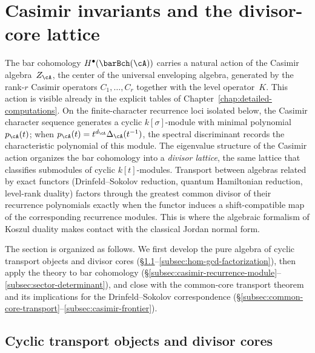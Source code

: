 
\section{Casimir invariants and the divisor-core lattice}
\label{sec:casimir-divisor-core}

The bar cohomology $H^\bullet(\barBch(\cA))$ carries a natural
action of the Casimir algebra~$Z_\cA$, the center of the
universal enveloping algebra, generated by the rank-$r$ Casimir
operators $C_1,\ldots,C_r$ together with the level
operator~$K$. This action is visible already in the explicit
tables of Chapter~\ref{chap:detailed-computations}. On the
finite-character recurrence loci isolated below, the Casimir character
sequence generates a cyclic $k[\sigma]$-module with minimal polynomial
$p_\cA(t)$; when $p_\cA(t)=t^{d_\cA}\Delta_\cA(t^{-1})$, the
spectral discriminant records the characteristic polynomial of this
module. The eigenvalue structure of the Casimir action organizes the
bar cohomology into a \emph{divisor lattice}, the same lattice that
classifies submodules of cyclic $k[t]$-modules. Transport between
algebras related by exact functors (Drinfeld--Sokolov reduction,
quantum Hamiltonian reduction, level-rank duality) factors through
the greatest common divisor of their recurrence polynomials exactly
when the functor induces a shift-compatible map of the corresponding
recurrence modules. This is where the algebraic formalism of Koszul
duality makes contact with the classical Jordan normal form.

\medskip

The section is organized as follows. We first develop the pure
algebra of cyclic transport objects and divisor cores
(\S\ref{subsec:cyclic-transport-objects}--\ref{subsec:hom-gcd-factorization}),
then apply the theory to bar cohomology
(\S\ref{subsec:casimir-recurrence-module}--\ref{subsec:sector-determinant}),
and close with the common-core transport theorem and its
implications for the Drinfeld--Sokolov correspondence
(\S\ref{subsec:common-core-transport}--\ref{subsec:casimir-frontier}).

\subsection{Cyclic transport objects and divisor cores}
\label{subsec:cyclic-transport-objects}

